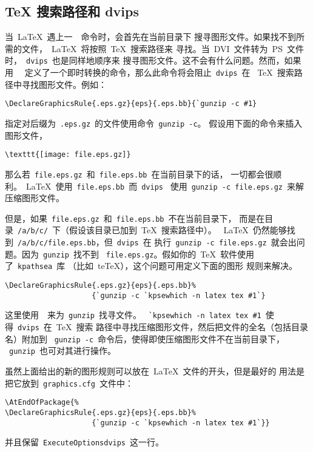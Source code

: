 \clearpage

\subsection{\TeX{} 搜索路径和 dvips}\label{ssec:dvips}

当~\LaTeX{}~遇上一~~命令时，会首先在当前目录下
搜寻图形文件。如果找不到所需的文件，~\LaTeX{}~将按照~\TeX{}~搜索路径来
寻找。当~DVI~文件转为~PS~文件时，~\texttt{dvips}~也是同样地顺序来
搜寻图形文件。这不会有什么问题。然而，如果用~~
定义了一个即时转换的命令，那么此命令将会阻止~\texttt{dvips}~在
~\TeX{}~搜索路径中寻找图形文件。例如：
\begin{Verbatim}[xleftmargin=1cm]
\DeclareGraphicsRule{.eps.gz}{eps}{.eps.bb}{`gunzip -c #1}
\end{Verbatim}
指定对后缀为~\texttt{.eps.gz}~的文件使用命令~\texttt{gunzip -c}。
假设用下面的命令来插入图形文件，
\begin{Verbatim}[xleftmargin=1cm]
\texttt{[image: file.eps.gz]}
\end{Verbatim}
那么若~\texttt{file.eps.gz}~和~\texttt{file.eps.bb}~在当前目录下的话，
一切都会很顺利。~\LaTeX{}~使用~\texttt{file.eps.bb}~而~\texttt{dvips}~
使用~\texttt{gunzip -c file.eps.gz}~来解压缩图形文件。

但是，如果~\texttt{file.eps.gz}~和~\texttt{file.eps.bb}~不在当前目录下，
而是在目录~\texttt{/a/b/c/}~下（假设该目录已加到~\TeX{}~搜索路径中）。
~\LaTeX{}~仍然能够找到~\texttt{/a/b/c/file.eps.bb}，但~\texttt{dvips}~在
执行~\texttt{gunzip -c file.eps.gz}~就会出问题。因为~\texttt{gunzip}~找不到
~\texttt{file.eps.gz}。假如你的~\TeX{}~软件使用了~\texttt{kpathsea}~库
（比如~teTeX），这个问题可用定义下面的图形
规则来解决。
\begin{Verbatim}[xleftmargin=1cm]
\DeclareGraphicsRule{.eps.gz}{eps}{.eps.bb}%
                    {`gunzip -c `kpsewhich -n latex tex #1`}
\end{Verbatim}
这里使用~~来为~\texttt{gunzip}~找寻文件。
~\verb+`kpsewhich -n latex tex #1+~使得~\texttt{dvips}~在~\TeX{}~搜索
路径中寻找压缩图形文件，然后把文件的全名（包括目录名）附加到
~\texttt{gunzip -c}~命令后，使得即使压缩图形文件不在当前目录下，
~\texttt{gunzip}~也可对其进行操作。

虽然上面给出的新的图形规则可以放在~\LaTeX{}~文件的开头，但是最好的
用法是把它放到~\texttt{graphics.cfg}~文件中：
\begin{Verbatim}[xleftmargin=1cm]
\AtEndOfPackage{%
\DeclareGraphicsRule{.eps.gz}{eps}{.eps.bb}%
                    {`gunzip -c `kpsewhich -n latex tex #1`}}
\end{Verbatim}
并且保留~\texttt{\bs ExecuteOptions{dvips}}~这一行。

